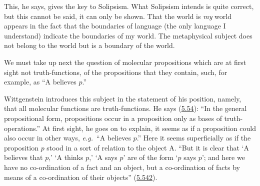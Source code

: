 \documentclass[12pt,oneside]{book}[2007/10/19]
\newcommand{\PropERef}[1]{\hyperref[PropE:#1]{#1}}
\newcommand{\exempliGratia}{\textit{e.g.}}
\begin{document}
This, he says, gives the key to Solipsism. What
Solipsism intends is quite correct, but this cannot be
said, it can only be shown. That the world is \emph{my} world
appears in the fact that the boundaries of language (the
only language I understand) indicate the boundaries of
my world. The metaphysical subject does not belong to
the world but is a boundary of the world.

We must take up next the question of molecular propositions
which are at first sight not truth-functions,
of the propositions that they contain, such, for example,
as ``A believes $p$.''

Wittgenstein introduces this subject in the statement
of his position, namely, that all molecular functions are
truth-functions. He says (\PropERef{5.54}): ``In the general propositional
form, propositions occur in a proposition only
as bases of truth-operations.'' At first sight, he goes on
to explain, it seems as if a proposition could also occur
in other ways, \exempliGratia\ ``A believes $p$.'' Here it seems superficially
as if the proposition $p$ stood in a sort of relation
to the object A. ``But it is clear that `A believes that
$p$,' `A thinks $p$,' `A says $p$' are of the form `$p$ says $p$';
and here we have no co-ordination of a fact and an object,
but a co-ordination of facts by means of a co-ordination
of their objects'' (\PropERef{5.542}).
\end{document}
